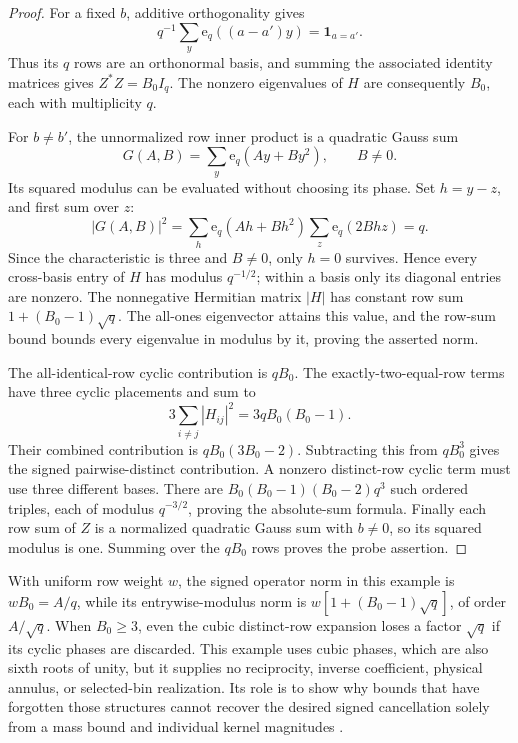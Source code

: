 \documentclass[11pt]{article}
\theoremstyle{definition}
\begin{document}
\begin{proof}
For a fixed \(b\), additive orthogonality gives
\[
 q^{-1}\sum_y\mathrm e_q((a-a')y)
       =\mathbf1_{a=a'}.
\]
Thus its \(q\) rows are an orthonormal basis, and summing the associated
identity matrices gives \(Z^*Z=B_0I_q\).  The nonzero eigenvalues of
\(H\) are consequently \(B_0\), each with multiplicity \(q\).

For \(b\ne b'\), the unnormalized row inner product is a quadratic
Gauss sum
\[
 G(A,B)=\sum_y\mathrm e_q(Ay+By^2),\qquad B\ne0.
\]
Its squared modulus can be evaluated without choosing its phase.
Set \(h=y-z\), and first sum over \(z\):
\[
 |G(A,B)|^2
   =\sum_h\mathrm e_q(Ah+Bh^2)
                     \sum_z\mathrm e_q(2Bhz)=q.
\]
Since the characteristic is three and \(B\ne0\), only \(h=0\)
survives.  Hence every cross-basis entry of \(H\) has modulus
\(q^{-1/2}\); within a basis only its diagonal entries are nonzero.
The nonnegative Hermitian matrix \(|H|\) has constant row sum
\(1+(B_0-1)\sqrt q\).  The all-ones eigenvector attains this value,
and the row-sum bound bounds every eigenvalue in modulus by it,
proving the asserted norm.

The all-identical-row cyclic contribution is \(qB_0\).
The exactly-two-equal-row terms have three cyclic placements and sum
to
\[
 3\sum_{i\ne j}|H_{ij}|^2=3qB_0(B_0-1).
\]
Their combined contribution is \(qB_0(3B_0-2)\).
Subtracting this from \(qB_0^3\) gives the signed
pairwise-distinct contribution.  A nonzero distinct-row cyclic term
must use three different bases.  There are
\(B_0(B_0-1)(B_0-2)q^3\) such ordered triples, each of modulus
\(q^{-3/2}\), proving the absolute-sum formula.
Finally each row sum of \(Z\) is a normalized quadratic Gauss sum
with \(b\ne0\), so its squared modulus is one.  Summing over the
\(qB_0\) rows proves the probe assertion.
\end{proof}

With uniform row weight \(w\), the signed operator norm in this
example is \(wB_0=A/q\), while its entrywise-modulus norm is
\(w[1+(B_0-1)\sqrt q]\), of order \(A/\sqrt q\).
When \(B_0\ge3\), even the cubic distinct-row expansion loses a
factor \(\sqrt q\) if its cyclic phases are discarded.
This example uses cubic phases, which are also sixth roots of unity,
but it supplies no reciprocity, inverse coefficient, physical annulus,
or selected-bin realization.  Its role is to show why bounds that
have forgotten those structures cannot recover the desired signed
cancellation solely from a mass bound and individual kernel
magnitudes \cite{n2}.
\end{document}
